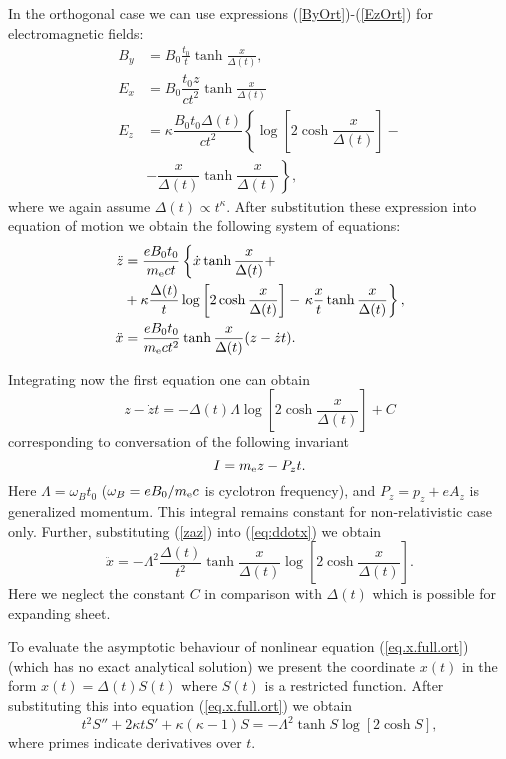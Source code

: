 \documentclass[useAMS,usenatbib]{mn2e}
\begin{document}
In the orthogonal case we can use expressions (\ref{ByOrt})-(\ref{EzOrt}) for electromagnetic 
fields:
\begin{align}
B_y &= B_0 \frac{t_0}{t} \tanh\frac{x}{\Delta(t)},\\
E_x &= B_0\dfrac{t_0z}{ct^2} \tanh\frac{x}{\Delta(t)}\\
E_z &= \kappa \dfrac{B_0t_0\Delta(t)}{ct^2} 
\left\{\log\left[2\cosh\dfrac{x}{\Delta(t)}\right]-\right.\\
&-\left. \dfrac{x}{\Delta(t)} \tanh\dfrac{x}{\Delta(t)}\right\},
\end{align}
where we again assume $\Delta(t)\propto t^{\kappa}$. After substitution these expression into equation 
of motion we obtain the following system of equations:
\begin{align}
\ddot{z} &= \dfrac{eB_0t_0}{m_{\rm e} c t}\left\{\dot{x}\tanh\dfrac{x}{\Delta(t)}+\right.\\
&+\kappa\dfrac{\Delta(t)}{t}\log\left[2\cosh\dfrac{x}{\Delta(t)}\right]
-\left.\kappa\dfrac{x}{t}\tanh\dfrac{x}{\Delta(t)}\right\},
\nonumber \\
\ddot{x} &= \dfrac{eB_0t_0}{m_{\rm e} ct^2}\tanh\dfrac{x}{\Delta(t)}(z-\dot{z}t).\label{eq:ddotx}
\end{align}

Integrating now the first equation one can obtain
\begin{equation}
z-\dot{z}t=-\Delta(t)\Lambda\log\left[2\cosh\dfrac{x}{\Delta(t)}\right]+C
\label{zaz}
\end{equation}
corresponding to conversation of the following invariant 
\begin{equation}
I = m_{\rm e}z - P_{z}t.
\label{Iinv}
\end{equation}
Here $\Lambda =  \omega_{B} t_0$ ($\omega_{B}= e B_0/m_{\rm e} c$ is cyclotron frequency),
and $P_z = p_z + e A_z$ is generalized momentum. This integral remains constant for non-relativistic 
case only. Further, substituting (\ref{zaz}) into (\ref{eq:ddotx}) we obtain
\begin{equation}
\label{eq.x.full.ort}
\ddot{x}=-\Lambda^2\frac{\Delta(t)}{t^2}\tanh\dfrac{x}{\Delta(t)}\log\left[2\cosh\dfrac{x}{\Delta(t)}\right].
\end{equation}
Here we neglect the constant $C$ in comparison with $\Delta(t)$ which is possible for expanding sheet.

To evaluate the asymptotic behaviour of nonlinear equation (\ref{eq.x.full.ort}) (which has 
no exact analytical solution) we present the coordinate $x(t)$ in the form $x(t) = \Delta(t)S(t)$ 
where $S(t)$ is a restricted function. After substituting this into equation (\ref{eq.x.full.ort}) 
we obtain
\begin{equation}
t^{2} S''+2 \kappa t S' + \kappa(\kappa-1)S
= -\Lambda^2\tanh S\log[2\cosh S],
\end{equation} 
where primes indicate derivatives over $t$. 
\end{document}
